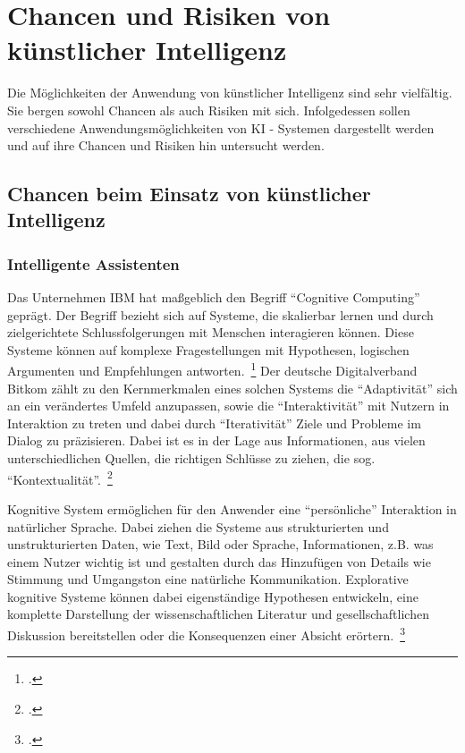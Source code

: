 \section{Chancen und Risiken von künstlicher Intelligenz} \label{Chancen und Risken von KI}
Die Möglichkeiten der Anwendung von künstlicher Intelligenz sind sehr vielfältig. Sie bergen sowohl Chancen als auch Risiken mit sich. 
Infolgedessen sollen verschiedene Anwendungsmöglichkeiten von KI - Systemen dargestellt werden und auf ihre Chancen und Risiken hin untersucht werden. 

\subsection{Chancen beim Einsatz von künstlicher Intelligenz}
\subsubsection{Intelligente Assistenten}
Das Unternehmen IBM hat maßgeblich den Begriff \enquote{Cognitive Computing} geprägt. Der Begriff bezieht sich auf Systeme,
die skalierbar lernen und durch zielgerichtete Schlussfolgerungen mit Menschen interagieren können.
Diese Systeme können auf komplexe Fragestellungen mit Hypothesen, logischen Argumenten und Empfehlungen antworten.~\footcite[\vglf][]{Scherk.2017}
Der deutsche Digitalverband Bitkom zählt zu den Kernmerkmalen eines solchen Systems die \enquote{Adaptivität} sich an ein verändertes Umfeld anzupassen, sowie die 
\enquote{Interaktivität} mit Nutzern in Interaktion zu treten und dabei durch \enquote{Iterativität} Ziele und Probleme im Dialog zu präzisieren. Dabei ist es in der Lage
aus Informationen, aus vielen unterschiedlichen Quellen, die richtigen Schlüsse zu ziehen, die sog. \enquote{Kontextualität}.~\footcite[\vglf][]{Scherk.2017}

Kognitive System ermöglichen für den Anwender eine \enquote{persönliche} Interaktion in natürlicher Sprache. Dabei ziehen die Systeme aus strukturierten und unstrukturierten
Daten, wie Text, Bild oder Sprache, Informationen, z.B. was einem Nutzer wichtig ist und gestalten durch das Hinzufügen von Details wie Stimmung und Umgangston eine natürliche 
Kommunikation. 
Explorative kognitive Systeme können dabei eigenständige Hypothesen entwickeln, eine komplette Darstellung der wissenschaftlichen Literatur und gesellschaftlichen
Diskussion bereitstellen oder die Konsequenzen einer Absicht erörtern.~\footcite[\vglf][]{Scherk.2017}

